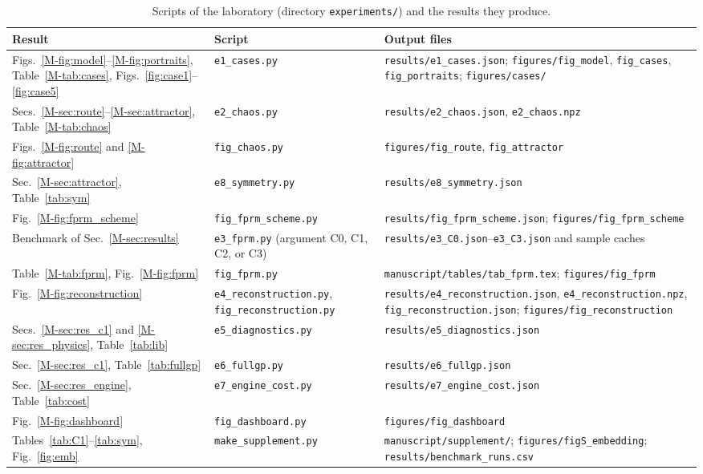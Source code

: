 \documentclass[10pt,letterpaper]{article}
\newcommand{\mref}[1]{\ref{M-#1}}
\begin{document}
\begin{table}[!htbp]
\caption{Scripts of the laboratory (directory \texttt{experiments/}) and the results they produce.}
\label{tab:guide}
\centering\footnotesize
\begin{tabular}{>{\raggedright\arraybackslash}p{}>{\raggedright\arraybackslash}p{}>{\raggedright\arraybackslash}p{}}
\toprule
Result & Script & Output files\\
\midrule
Figs.~\mref{fig:model}--\mref{fig:portraits}, Table~\mref{tab:cases}, Figs.~\ref{fig:case1}--\ref{fig:case5} & \texttt{e1\_cases.py} & \texttt{results/e1\_cases.json}; \texttt{figures/fig\_model}, \texttt{fig\_cases}, \texttt{fig\_portraits}; \texttt{figures/cases/}\\
Secs.~\mref{sec:route}--\mref{sec:attractor}, Table~\mref{tab:chaos} & \texttt{e2\_chaos.py} & \texttt{results/e2\_chaos.json}, \texttt{e2\_chaos.npz}\\
Figs.~\mref{fig:route} and \mref{fig:attractor} & \texttt{fig\_chaos.py} & \texttt{figures/fig\_route}, \texttt{fig\_attractor}\\
Sec.~\mref{sec:attractor}, Table~\ref{tab:sym} & \texttt{e8\_symmetry.py} & \texttt{results/e8\_symmetry.json}\\
Fig.~\mref{fig:fprm_scheme} & \texttt{fig\_fprm\_scheme.py} & \texttt{results/fig\_fprm\_scheme.json}; \texttt{figures/fig\_fprm\_scheme}\\
Benchmark of Sec.~\mref{sec:results} & \texttt{e3\_fprm.py} (argument C0, C1, C2, or C3) & \texttt{results/e3\_C0.json}--\texttt{e3\_C3.json} and sample caches\\
Table~\mref{tab:fprm}, Fig.~\mref{fig:fprm} & \texttt{fig\_fprm.py} & \texttt{manuscript/tables/tab\_fprm.tex}; \texttt{figures/fig\_fprm}\\
Fig.~\mref{fig:reconstruction} & \texttt{e4\_reconstruction.py}, \texttt{fig\_reconstruction.py} & \texttt{results/e4\_reconstruction.json}, \texttt{e4\_reconstruction.npz}, \texttt{fig\_reconstruction.json}; \texttt{figures/fig\_reconstruction}\\
Secs.~\mref{sec:res_c1} and \mref{sec:res_physics}, Table~\ref{tab:lib} & \texttt{e5\_diagnostics.py} & \texttt{results/e5\_diagnostics.json}\\
Sec.~\mref{sec:res_c1}, Table~\ref{tab:fullgp} & \texttt{e6\_fullgp.py} & \texttt{results/e6\_fullgp.json}\\
Sec.~\mref{sec:res_engine}, Table~\ref{tab:cost} & \texttt{e7\_engine\_cost.py} & \texttt{results/e7\_engine\_cost.json}\\
Fig.~\mref{fig:dashboard} & \texttt{fig\_dashboard.py} & \texttt{figures/fig\_dashboard}\\
Tables~\ref{tab:C1}--\ref{tab:sym}, Fig.~\ref{fig:emb} & \texttt{make\_supplement.py} & \texttt{manuscript/supplement/}; \texttt{figures/figS\_embedding}; \texttt{results/benchmark\_runs.csv}\\
\bottomrule
\end{tabular}
\end{table}
\end{document}
